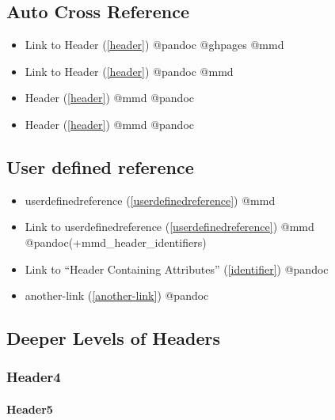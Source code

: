 \subsection{Auto Cross Reference}
\label{autocrossreference}

\begin{itemize}
\item Link to Header (\autoref{header}) @pandoc @ghpages @mmd

\item Link to Header (\autoref{header}) @pandoc @mmd

\item Header (\autoref{header}) @mmd @pandoc

\item Header (\autoref{header}) @mmd @pandoc

\end{itemize}

\subsection{User defined reference}
\label{userdefinedreference}

\begin{itemize}
\item userdefinedreference (\autoref{userdefinedreference}) @mmd

\item Link to userdefinedreference (\autoref{userdefinedreference}) @mmd @pandoc(+mmd\_header\_identifiers)

\item Link to ``Header Containing Attributes'' (\autoref{identifier}) @pandoc

\item another-link (\autoref{another-link}) @pandoc

\end{itemize}

\subsection{Deeper Levels of Headers}
\label{deeperlevelsofheaders}

\subsubsection{Header4}
\label{header4}

\paragraph{Header5}
\label{header5}

